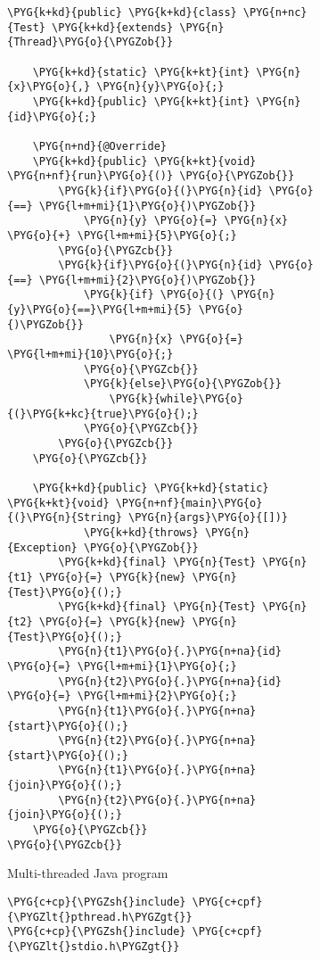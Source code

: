 
\begin{figure}[t]
\begin{subfigure}{.4\textwidth}
\begin{Verbatim}[commandchars=\\\{\}, fontsize=\footnotesize, baselinestretch=0.5]
\PYG{k+kd}{public} \PYG{k+kd}{class} \PYG{n+nc}{Test} \PYG{k+kd}{extends} \PYG{n}{Thread}\PYG{o}{\PYGZob{}}

    \PYG{k+kd}{static} \PYG{k+kt}{int} \PYG{n}{x}\PYG{o}{,} \PYG{n}{y}\PYG{o}{;}
    \PYG{k+kd}{public} \PYG{k+kt}{int} \PYG{n}{id}\PYG{o}{;}

    \PYG{n+nd}{@Override}
    \PYG{k+kd}{public} \PYG{k+kt}{void} \PYG{n+nf}{run}\PYG{o}{()} \PYG{o}{\PYGZob{}}
        \PYG{k}{if}\PYG{o}{(}\PYG{n}{id} \PYG{o}{==} \PYG{l+m+mi}{1}\PYG{o}{)\PYGZob{}}
            \PYG{n}{y} \PYG{o}{=} \PYG{n}{x} \PYG{o}{+} \PYG{l+m+mi}{5}\PYG{o}{;}
        \PYG{o}{\PYGZcb{}}
        \PYG{k}{if}\PYG{o}{(}\PYG{n}{id} \PYG{o}{==} \PYG{l+m+mi}{2}\PYG{o}{)\PYGZob{}}
            \PYG{k}{if} \PYG{o}{(} \PYG{n}{y}\PYG{o}{==}\PYG{l+m+mi}{5} \PYG{o}{)\PYGZob{}}
                \PYG{n}{x} \PYG{o}{=} \PYG{l+m+mi}{10}\PYG{o}{;}
            \PYG{o}{\PYGZcb{}}
            \PYG{k}{else}\PYG{o}{\PYGZob{}}
                \PYG{k}{while}\PYG{o}{(}\PYG{k+kc}{true}\PYG{o}{);}
            \PYG{o}{\PYGZcb{}}
        \PYG{o}{\PYGZcb{}}
    \PYG{o}{\PYGZcb{}}

    \PYG{k+kd}{public} \PYG{k+kd}{static} \PYG{k+kt}{void} \PYG{n+nf}{main}\PYG{o}{(}\PYG{n}{String} \PYG{n}{args}\PYG{o}{[])}
            \PYG{k+kd}{throws} \PYG{n}{Exception} \PYG{o}{\PYGZob{}}
        \PYG{k+kd}{final} \PYG{n}{Test} \PYG{n}{t1} \PYG{o}{=} \PYG{k}{new} \PYG{n}{Test}\PYG{o}{();}
        \PYG{k+kd}{final} \PYG{n}{Test} \PYG{n}{t2} \PYG{o}{=} \PYG{k}{new} \PYG{n}{Test}\PYG{o}{();}
        \PYG{n}{t1}\PYG{o}{.}\PYG{n+na}{id} \PYG{o}{=} \PYG{l+m+mi}{1}\PYG{o}{;}
        \PYG{n}{t2}\PYG{o}{.}\PYG{n+na}{id} \PYG{o}{=} \PYG{l+m+mi}{2}\PYG{o}{;}
        \PYG{n}{t1}\PYG{o}{.}\PYG{n+na}{start}\PYG{o}{();}
        \PYG{n}{t2}\PYG{o}{.}\PYG{n+na}{start}\PYG{o}{();}
        \PYG{n}{t1}\PYG{o}{.}\PYG{n+na}{join}\PYG{o}{();}
        \PYG{n}{t2}\PYG{o}{.}\PYG{n+na}{join}\PYG{o}{();}
    \PYG{o}{\PYGZcb{}}
\PYG{o}{\PYGZcb{}}
\end{Verbatim}
\vspace{0.5cm}
\caption{Multi-threaded Java program}
\label{simple_java}
\end{subfigure}
\hfill
\begin{subfigure}{.4\textwidth}
\begin{Verbatim}[commandchars=\\\{\}, fontsize=\footnotesize, baselinestretch=0.5]
\PYG{c+cp}{\PYGZsh{}include} \PYG{c+cpf}{\PYGZlt{}pthread.h\PYGZgt{}}
\PYG{c+cp}{\PYGZsh{}include} \PYG{c+cpf}{\PYGZlt{}stdio.h\PYGZgt{}}


\end{Verbatim}
\end{subfigure}
\end{figure}
